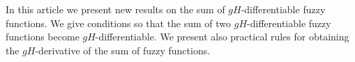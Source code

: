 
In this article we present new results on the sum of $gH$-differentiable fuzzy functions. We give conditions so that the sum of two $gH$-differentiable fuzzy functions become $gH$-differentiable. We present also practical rules for obtaining the $gH$-derivative of the sum of fuzzy functions. 



